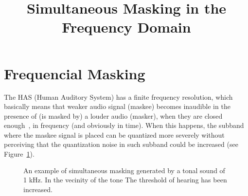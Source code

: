 

\title{Simultaneous Masking in the Frequency Domain}


\maketitle

\section{Frequencial Masking}
The HAS (Human Auditory System) has a finite frequency resolution,
which basically means that weaker audio signal (maskee) becomes
inaudible in the presence of (is masked by) a louder audio (masker),
when they are closed enough~\cite{bosi2003intro}, in frequency (and
obviously in time). When this happens, the
subband~\cite{vetterli1995wavelets} where the maskee signal is placed
can be quantized more severely without perceiving that the
quantization noise in such subband could be increased (see
Figure~\ref{fig:SM}).

\begin{figure}
  \centering
  \caption{An example of simultaneous masking generated by a tonal
    sound of 1 kHz. In the vecinity of the tone The threshold of
    hearing has been increased.}
  \label{fig:SM}
\end{figure}



